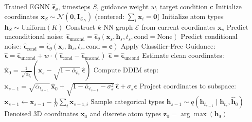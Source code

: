 \documentclass[12pt, a4paper]{article}
\begin{document}
\begin{algorithm}[H]
\caption{3D Equivariant Diffusion Molecular Generation (DDIM Reverse Sampling)}
\label{alg:sampling}
\begin{algorithmic}[1]
\REQUIRE Trained EGNN $\hat{\boldsymbol{\epsilon}}_\theta$, timesteps $S$, guidance weight $w$, target condition $\mathbf{c}$
\STATE Initialize coordinates $\mathbf{x}_S \sim \mathcal{N}(\mathbf{0}, \mathbf{I}_{\mathcal{Z}_N})$ (centered: $\sum_i \mathbf{x}_i = \mathbf{0}$)
\STATE Initialize atom types $\mathbf{h}_S \sim \text{Uniform}(K)$
    \STATE Construct $k$-NN graph $\mathcal{E}$ from current coordinates $\mathbf{x}_s$
    \STATE Predict unconditional noise: $\hat{\boldsymbol{\epsilon}}_\text{uncond} = \hat{\boldsymbol{\epsilon}}_\theta(\mathbf{x}_s, \mathbf{h}_s, t_s, \text{cond}=\text{None})$
        \STATE Predict conditional noise: $\hat{\boldsymbol{\epsilon}}_\text{cond} = \hat{\boldsymbol{\epsilon}}_\theta(\mathbf{x}_s, \mathbf{h}_s, t_s, \text{cond}=\mathbf{c})$
        \STATE Apply Classifier-Free Guidance: $\hat{\boldsymbol{\epsilon}} = \hat{\boldsymbol{\epsilon}}_\text{uncond} + w \cdot (\hat{\boldsymbol{\epsilon}}_\text{cond} - \hat{\boldsymbol{\epsilon}}_\text{uncond})$
    \ELSE
        \STATE $\hat{\boldsymbol{\epsilon}} = \hat{\boldsymbol{\epsilon}}_\text{uncond}$
    \ENDIF
    \STATE Estimate clean coordinates: $\hat{\mathbf{x}}_0 = \frac{1}{\sqrt{\bar{\alpha}_{t_s}}} (\mathbf{x}_s - \sqrt{1 - \bar{\alpha}_{t_s}}\,\hat{\boldsymbol{\epsilon}})$
    \STATE Compute DDIM step: $\mathbf{x}_{s-1} = \sqrt{\bar{\alpha}_{t_{s-1}}}\,\hat{\mathbf{x}}_0 + \sqrt{1 - \bar{\alpha}_{t_{s-1}} - \sigma_s^2}\,\hat{\boldsymbol{\epsilon}} + \sigma_s \boldsymbol{\epsilon}$
    \STATE Project coordinates to subspace: $\mathbf{x}_{s-1} \gets \mathbf{x}_{s-1} - \frac{1}{N}\sum_i \mathbf{x}_{s-1, i}$
    \STATE Sample categorical types $\mathbf{h}_{s-1} \sim q(\mathbf{h}_{t_{s-1}} \mid \mathbf{h}_{t_s}, \hat{\mathbf{h}}_0)$
\ENDFOR
\RETURN Denoised 3D coordinates $\mathbf{x}_0$ and discrete atom types $\mathbf{z}_0 = \arg\max(\mathbf{h}_0)$
\end{algorithmic}
\end{algorithm}
\end{document}
